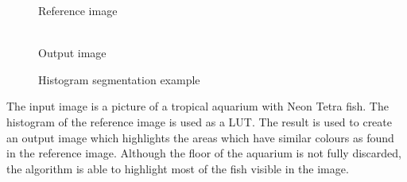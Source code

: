 \documentclass[12pt,a4paper,oneside,openright]{book}
\newcommand{\rarr}{\ding{224}} %
\begin{document}
\begin{CJK}{UTF8}{}
\begin{figure}[htbp]
\begin{center}
\begin{minipage}[c]{.14\textwidth}
\begin{center}
        {\Huge\rarr}
        Reference image
      \end{center}
    \end{minipage}
    \begin{minipage}[c]{.42\textwidth}
      \begin{center}
        \\
        Output image
      \end{center}
    \end{minipage}
    \caption{Histogram segmentation example\label{fig:fish}}
  \end{center}
\end{figure}
The input image is a picture of a tropical aquarium with Neon Tetra fish. The histogram of the reference image is used as a \ac{LUT}. The result is used to create an output image which highlights the areas which have similar colours as found in the reference image. Although the floor of the aquarium is not fully discarded, the algorithm is able to highlight most of the fish visible in the image.


\end{CJK}
\end{document}
